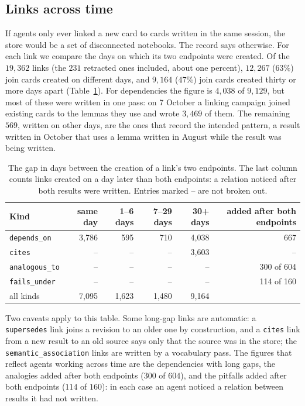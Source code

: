 \subsection{Links across time}
If agents only ever linked a new card to cards written in the same session, the store would be a set of disconnected notebooks. The record says otherwise. For each link we compare the days on which its two endpoints were created. Of the $19{,}362$ links (the $231$ retracted ones included, about one percent), $12{,}267$ ($63\%$) join cards created on different days, and $9{,}164$ ($47\%$) join cards created thirty or more days apart (Table~\ref{tab:lag}). For dependencies the figure is $4{,}038$ of $9{,}129$, but most of these were written in one pass: on 7 October a linking campaign joined existing cards to the lemmas they use and wrote $3{,}469$ of them. The remaining $569$, written on other days, are the ones that record the intended pattern, a result written in October that uses a lemma written in August while the result was being written.

\begin{table}[ht]
\centering\small
\begin{tabular}{lrrrrr}
\toprule
Kind & same day & 1--6 days & 7--29 days & 30+ days & added after both endpoints\\
\midrule
\texttt{depends\_on} & 3{,}786 & 595 & 710 & 4{,}038 & 667\\
\texttt{cites} & -- & -- & -- & 3{,}603 & --\\
\texttt{analogous\_to} & -- & -- & -- & -- & 300 of 604\\
\texttt{fails\_under} & -- & -- & -- & -- & 114 of 160\\
\midrule
all kinds & 7{,}095 & 1{,}623 & 1{,}480 & 9{,}164 & \\
\bottomrule
\end{tabular}
\caption{The gap in days between the creation of a link's two endpoints. The last column counts links created on a day later than both endpoints: a relation noticed after both results were written. Entries marked -- are not broken out.}
\label{tab:lag}
\end{table}

Two caveats apply to this table. Some long-gap links are automatic: a \texttt{supersedes} link joins a revision to an older one by construction, and a \texttt{cites} link from a new result to an old source says only that the source was in the store; the \texttt{semantic\_association} links are written by a vocabulary pass. The figures that reflect agents working across time are the dependencies with long gaps, the analogies added after both endpoints ($300$ of $604$), and the pitfalls added after both endpoints ($114$ of $160$): in each case an agent noticed a relation between results it had not written.

